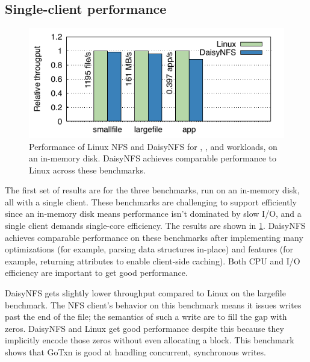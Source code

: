 \subsection{Single-client performance}



\begin{figure}[ht]
  \centering
  \includegraphics{daisy-nfs/fig/bench.pdf}
  \caption[Performance for smallfile, largefile, and app benchmarks]%
  {Performance of Linux NFS and DaisyNFS for ,
    , and  workloads, on an in-memory disk.
    DaisyNFS achieves comparable performance to Linux across these benchmarks.}
  \label{fig:eval:bench}
\end{figure}

The first set of results are for the three benchmarks, run on an in-memory disk, all
with a single client. These benchmarks are challenging to support efficiently
since an in-memory disk means performance isn't dominated by slow I/O, and a
single client demands single-core efficiency.
The results are shown in \cref{fig:eval:bench}. DaisyNFS achieves
comparable performance on these benchmarks after implementing many optimizations
(for example, parsing data structures in-place) and features (for example,
returning attributes to enable client-side caching). Both CPU and I/O efficiency
are important to get good performance.

DaisyNFS gets slightly lower throughput compared to Linux on the largefile
benchmark. The NFS client's behavior on
this benchmark means it issues writes past the end of the file; the semantics of
such a write are to fill the gap with zeros. DaisyNFS and Linux get good
performance despite this because they implicitly encode those zeros without even
allocating a block. This benchmark shows that GoTxn is good at handling
concurrent, synchronous writes.

